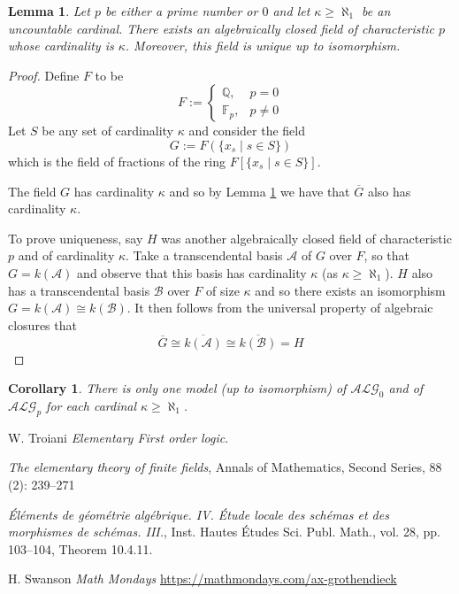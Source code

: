 \documentclass[12pt]{article}
\theoremstyle{plain}
\newtheorem{lemma}[thm]{Lemma}
\newtheorem{cor}[thm]{Corollary}
\theoremstyle{definition}
\newcommand{\bb}[1]{\mathbb{#1}}
\newcommand{\scr}[1]{\mathscr{#1}}
\newcommand{\call}[1]{\mathcal{#1}}
\begin{document}
\begin{lemma}\label{lem:alg_arb_card}
	Let $p$ be either a prime number or $0$ and let $\kappa \geq \aleph_1$ be an uncountable cardinal. There exists an algebraically closed field of characteristic $p$ whose cardinality is $\kappa$. Moreover, this field is unique up to isomorphism.
\end{lemma}
\begin{proof}
	Define $F$ to be
	\begin{equation}
		F := \begin{cases}
			\bb{Q},& p = 0\\
			\bb{F}_p, & p \neq 0
		\end{cases}
	\end{equation}
	Let $S$ be any set of cardinality $\kappa$ and consider the field
	\begin{equation}
		G := F(\{ x_s \mid s \in S \})
		\end{equation}
	which is the field of fractions of the ring $F[\{ x_s \mid s \in S \}]$.
	
	The field $G$ has cardinality $\kappa$ and so by Lemma \ref{lem:alg_arb_card} we have that $\overline{G}$ also has cardinality $\kappa$.
	
	To prove uniqueness, say $H$ was another algebraically closed field of characteristic $p$ and of cardinality $\kappa$. Take a transcendental basis $\scr{A}$ of $G$ over $F$, so that $G = k(\scr{A})$ and observe that this basis has cardinality $\kappa$ (as $\kappa \geq \aleph_1$). $H$ also has a transcendental basis $\scr{B}$ over $F$ of size $\kappa$ and so there exists an isomorphism $G = k(\scr{A}) \cong k(\scr{B})$. It then follows from the universal property of algebraic closures that
	\begin{equation}
		\overline{G} \cong \overline{k(\scr{A})} \cong \overline{k(\scr{B})} = H
		\end{equation}
\end{proof}

\begin{cor}
	There is only one model (up to isomorphism) of $\call{ALG}_0$ and of $\call{ALG}_p$ for each cardinal $\kappa \geq \aleph_1$.
\end{cor}
	
	\begin{thebibliography}{9}
		 W. Troiani \emph{Elementary First order logic}.
		
		 \emph{The elementary theory of finite fields}, Annals of Mathematics, Second Series, 88 (2): 239–271
		
		  \emph{Éléments de géométrie algébrique. IV. Étude locale des schémas et des morphismes de schémas. III.}, Inst. Hautes Études Sci. Publ. Math., vol. 28, pp. 103–104, Theorem 10.4.11.
		
		 H. Swanson \emph{Math Mondays} \url{https://mathmondays.com/ax-grothendieck}
		\end{thebibliography}
	
	
\end{document}
